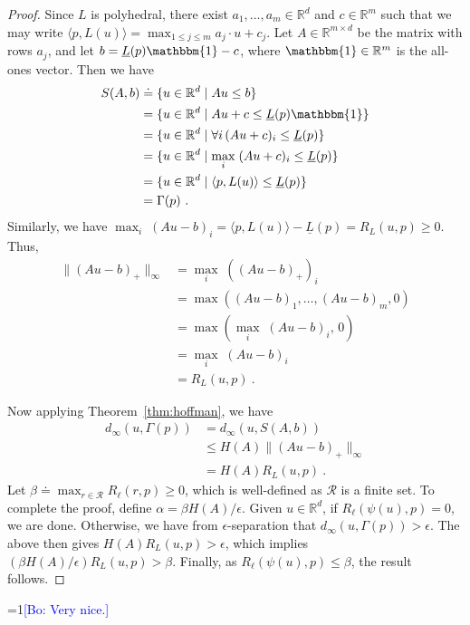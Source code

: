 \documentclass[12pt]{article}
\newcommand{\Comments}{1}
\newcommand{\mynote}[2]{\ifnum\Comments=1\textcolor{#1}{#2}\fi}
\newcommand{\bo}[1]{\mynote{blue}{[Bo: #1]}}
\newcommand{\reals}{\mathbb{R}}
\newcommand{\defeq}{\doteq}%
\newcommand{\R}{\mathcal{R}}
\newcommand{\risk}[1]{\underline{#1}}
\newcommand{\inprod}[2]{\langle #1, #2 \rangle}%
\newcommand{\ones}{\mathbbm{1}}
\newcommand{\regret}[3]{R_{#1}(#2,#3)}
\begin{document}
\begin{proof}
  Since $L$ is polyhedral, there exist $a_1,\ldots,a_m \in \reals^d$ and $c\in\reals^m$ such that we may write $\inprod{p}{L(u)} = \max_{1\leq j\leq m} a_j \cdot u + c_j$.
  Let $A \in \reals^{m\times d}$ be the matrix with rows $a_j$, and let $b = \risk{L}(p)\ones - c$, where $\ones\in\reals^m$ is the all-ones vector.
  Then we have
  \begin{align*}
    S(A,b)
    &\defeq \{u\in\reals^d \mid A u \leq b\}
    \\
    &= \{u\in\reals^d \mid A u + c \leq \risk{L}(p)\ones\}
    \\
    &= \{u\in\reals^d \mid \forall i\, (A u + c)_i \leq \risk{L}(p)\}
    \\
    &= \{u\in\reals^d \mid \max_i \;(A u + c)_i \leq \risk{L}(p)\}
    \\
    &= \{u\in\reals^d \mid \inprod{p}{L(u)} \leq \risk{L}(p)\}
    \\
    & = \Gamma(p)~.
  \end{align*}
  Similarly, we have $\max_i\; (A u - b)_i = \inprod{p}{L(u)} - \risk{L}(p) = \regret{L}{u}{p} \geq 0$.
  Thus,
  \begin{align*}
    \|(Au - b)_+\|_\infty
    &= \max_i\; ((Au - b)_+)_i
    \\
    &= \max((Au - b)_1,\ldots,(Au - b)_m, 0)
    \\
    &= \max(\max_i\; (Au - b)_i, \, 0)
    \\
    &= \max_i\; (Au - b)_i
    \\
    &= \regret{L}{u}{p}~.
  \end{align*}

  Now applying Theorem~\ref{thm:hoffman}, we have
  \begin{align*}
    d_\infty(u,\Gamma(p))
    &=    d_\infty(u,S(A,b))
    \\
    &\leq H(A) \|(Au-b)_+\|_\infty
    \\
    &= H(A) \regret{L}{u}{p}~.
  \end{align*}
  Let $\beta \defeq \max_{r\in\R} \regret{\ell}{r}{p}\geq 0$, which is well-defined as $\R$ is a finite set.
  To complete the proof, define $\alpha = \beta H(A)/\epsilon$.
  Given $u\in\reals^d$, if $\regret{\ell}{\psi(u)}{p} = 0$, we are done.
  Otherwise, we have from $\epsilon$-separation that $d_\infty(u,\Gamma(p)) > \epsilon$.
  The above then gives $H(A) \regret{L}{u}{p} > \epsilon$, which implies
  $(\beta H(A) / \epsilon) \regret{L}{u}{p} > \beta$.
  Finally, as $\regret{\ell}{\psi(u)}{p} \leq \beta$, the result follows.
\end{proof}
\bo{Very nice.}
\end{document}
